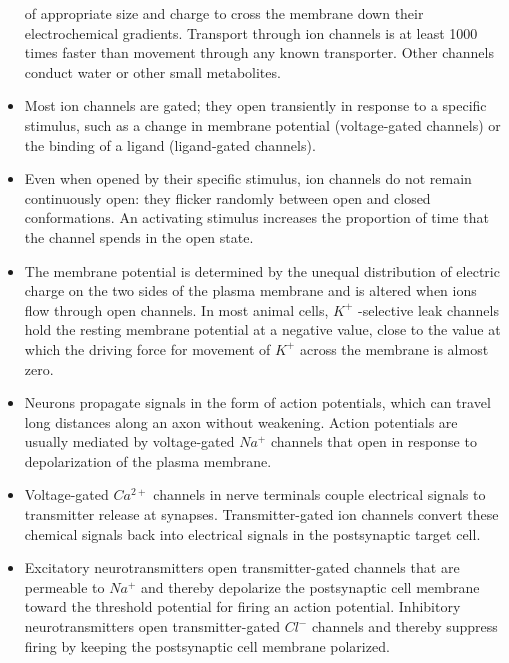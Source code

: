 \begin{itemize}
of appropriate size and charge to cross the membrane down their
electrochemical gradients. Transport through ion channels is at least
1000 times faster than movement through any known transporter.
Other channels conduct water or other small metabolites.
\item Most ion channels are gated; they open transiently in response to a
specific stimulus, such as a change in membrane potential (voltage-gated
channels) or the binding of a ligand (ligand-gated channels).
\item Even when opened by their specific stimulus, ion channels do not
remain continuously open: they flicker randomly between open and
closed conformations. An activating stimulus increases the proportion
of time that the channel spends in the open state.
\item The membrane potential is determined by the unequal distribution
of electric charge on the two sides of the plasma membrane and is
altered when ions flow through open channels. In most animal cells,
$K^{+}$ -selective leak channels hold the resting membrane potential at
a negative value, close to the value at which the driving force for
movement of $K^{+}$ across the membrane is almost zero.
\item Neurons propagate signals in the form of action potentials, which
can travel long distances along an axon without weakening. Action
potentials are usually mediated by voltage-gated $Na^{+}$ channels that
open in response to depolarization of the plasma membrane.
\item Voltage-gated $Ca^{2+}$ channels in nerve terminals couple electrical
signals to transmitter release at synapses. Transmitter-gated ion
channels convert these chemical signals back into electrical signals
in the postsynaptic target cell.
\item Excitatory neurotransmitters open transmitter-gated channels that
are permeable to $Na^{+}$ and thereby depolarize the postsynaptic cell
membrane toward the threshold potential for firing an action potential.
Inhibitory neurotransmitters open transmitter-gated $Cl^{-}$ channels
and thereby suppress firing by keeping the postsynaptic cell membrane polarized.
\end{itemize}
